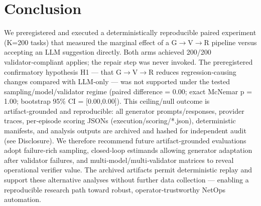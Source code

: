 \documentclass[conference]{IEEEtran}
\begin{document}
\section{Conclusion}
We preregistered and executed a deterministically reproducible paired experiment (K=200 tasks) that measured the marginal effect of a G\ensuremath{\rightarrow}V\ensuremath{\rightarrow}R pipeline versus accepting an LLM suggestion directly. Both arms achieved 200/200 validator‑compliant applies; the repair step was never invoked. The preregistered confirmatory hypothesis H1 --- that G\ensuremath{\rightarrow}V\ensuremath{\rightarrow}R reduces regression‑causing changes compared with LLM‑only --- was not supported under the tested sampling/model/validator regime (paired difference = 0.00; exact McNemar p = 1.00; bootstrap 95\% CI = [0.00,0.00]). This ceiling/null outcome is artifact‑grounded and reproducible: all generator prompts/responses, provider traces, per‑episode scoring JSONs (execution/scoring/*.json), deterministic manifests, and analysis outputs are archived and hashed for independent audit (see Disclosure). We therefore recommend future artifact‑grounded evaluations adopt failure‑rich sampling, closed‑loop estimands allowing generator adaptation after validator failures, and multi‑model/multi‑validator matrices to reveal operational verifier value. The archived artifacts permit deterministic replay and support these alternative analyses without further data collection --- enabling a reproducible research path toward robust, operator‑trustworthy NetOps automation.
\end{document}

